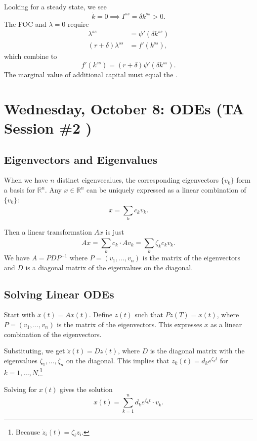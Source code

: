 \documentclass{tufte-handout}
\newcommand*\R{\mathbb{R}}
\theoremstyle{definition}
\begin{document}
Looking for a steady state, we see
\[
	\dot{k} = 0 \implies I^{ss} = \delta k^{ss} > 0
.\] The FOC and $\dot{\lambda} = 0$ require 
\begin{align*}
	\lambda^{ss} &= \psi'(\delta k^{ss}) \\
	(r + \delta)\lambda^{ss} &= f'(k^{ss})
,\end{align*} which combine to \[
	f'(k^{ss}) = (r+\delta)\psi'(\delta k^{ss})
.\] The marginal value of additional capital must equal the .


\section{Wednesday, October 8: ODEs (TA Session \#2 )}

\subsection{Eigenvectors and Eigenvalues}

When we have $n$ distinct eigenvecalues, the corresponding eigenvectors $\{v_k\}$ form a basis for $\R^n$. Any $x \in \R^n$ can be uniquely expressed as a linear combination of $\{v_k\}$: \[
	x = \sum\limits_{k}^{} c_k v_k
.\] 

Then a linear transformation $Ax$ is just \[
	Ax = \sum\limits_{k}^{} c_k \cdot Av_k = \sum\limits_{k}^{} \zeta_k c_k v_k
.\] 
We have $A = PDP^{-1}$ where $P = \left( v_1,\ldots,v_n \right)$ is the matrix of the eigenvectors and $D$ is a diagonal matrix of the eigenvalues on the diagonal.

\subsection{Solving Linear ODEs}
Start with $\dot{x}(t) = Ax(t)$. Define $z(t)$ such that $Pz(T) = x(t)$, where $P = (v_1,\ldots,v_n)$ is the matrix of the eigenvectors. This expresses $x$ as a linear combination of the eigenvectors.

Substituting, we get $\dot{z}(t) = Dz(t)$, where $D$ is the diagonal matrix with the eigenvalues $\zeta_1,\ldots,\zeta_n$ on the diagonal. This implies that $z_k(t) = d_k e^{\zeta_k t}$ for $k=1,\ldots,N$.\footnote{Because $\dot{z}_i(t) = \zeta_i z_i$.}

Solving for $x(t)$ gives the solution \[
	x(t) = \sum\limits_{k=1}^{n} d_k e^{\zeta_k t} \cdot v_k
.\] 
\end{document}
